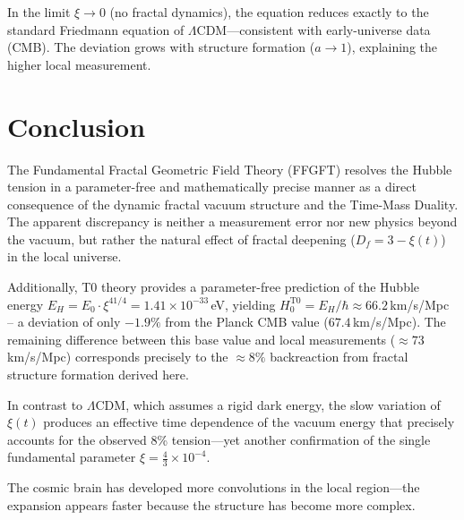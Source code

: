 	In the limit $\xi \to 0$ (no fractal dynamics), the equation reduces exactly to the standard Friedmann equation of $\Lambda$CDM—consistent with early-universe data (CMB). The deviation grows with structure formation ($a \to 1$), explaining the higher local measurement.
	
	\section*{Conclusion}
	
	The Fundamental Fractal Geometric Field Theory (FFGFT) resolves the Hubble tension in a parameter-free and mathematically precise manner as a direct consequence of the dynamic fractal vacuum structure and the Time-Mass Duality. The apparent discrepancy is neither a measurement error nor new physics beyond the vacuum, but rather the natural effect of fractal deepening ($D_f = 3 - \xi(t)$) in the local universe.
	
	Additionally, T0 theory provides a parameter-free prediction of the Hubble energy $E_H = E_0 \cdot \xi^{41/4} = 1.41 \times 10^{-33}\,$eV, yielding $H_0^{\text{T0}} = E_H/\hbar \approx 66.2\,$km/s/Mpc -- a deviation of only $-1.9\%$ from the Planck CMB value ($67.4\,$km/s/Mpc). The remaining difference between this base value and local measurements ($\approx 73\,$km/s/Mpc) corresponds precisely to the $\approx 8\%$ backreaction from fractal structure formation derived here.
	
	In contrast to $\Lambda$CDM, which assumes a rigid dark energy, the slow variation of $\xi(t)$ produces an effective time dependence of the vacuum energy that precisely accounts for the observed 8\% tension—yet another confirmation of the single fundamental parameter $\xi = \frac{4}{3} \times 10^{-4}$.
	
	The cosmic brain has developed more convolutions in the local region—the expansion appears faster because the structure has become more complex.




